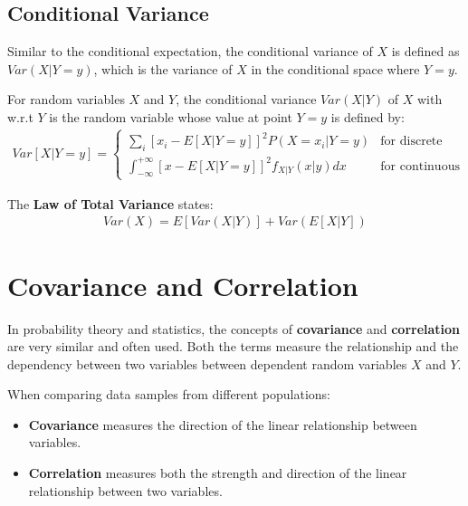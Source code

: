 \documentclass[10pt,a4paper]{article}
\begin{document}
\subsection{Conditional Variance}

Similar to the conditional expectation, the conditional variance of $X$ is defined as $Var(X|Y=y)$,
which is the variance of $X$ in the conditional space where $Y=y$.

\begin{tcolorbox}[breakable,colback=white]
For random variables $X$ and $Y$, the conditional variance $Var(X|Y)$ of $X$ with w.r.t $Y$ is the
random variable whose value at point $Y=y$ is defined by:
\begin{align*}
    Var[X|Y=y] = 
    \begin{cases}
        \sum_i [x_i - E[X|Y=y]]^2 P(X=x_i|Y=y) & \text{for discrete} \\
        \int_{-\infty}^{+\infty} [x - E[X|Y=y]]^2 f_{X|Y}(x|y)dx & \text{for continuous}
    \end{cases}
\end{align*}
\end{tcolorbox}

The \textbf{Law of Total Variance} states:
\begin{align*}
    Var(X)=E[Var(X|Y)]+Var(E[X|Y])
\end{align*}

\section{Covariance and Correlation}

In probability theory and statistics, the concepts of \textbf{covariance} and \textbf{correlation} are
very similar and often used. Both the terms measure the relationship and the dependency between two
variables between dependent random variables $X$ and $Y$.

When comparing data samples from different populations:
\begin{itemize}
    \item \textbf{Covariance} measures the direction of the linear relationship between variables.
    \item \textbf{Correlation} measures both the strength and direction of the linear relationship between two variables.
\end{itemize}
\end{document}

